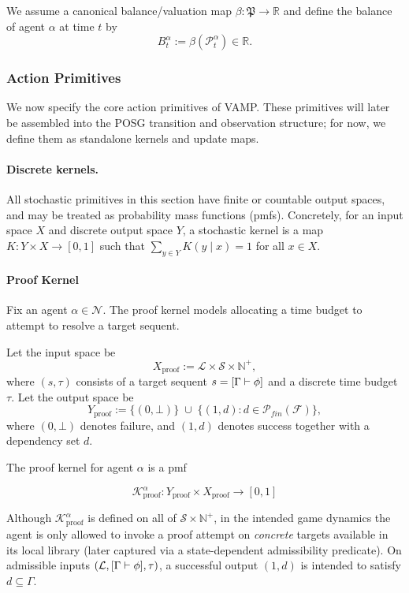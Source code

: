 We assume a canonical balance/valuation map $\beta:\mathfrak{P}\to\mathbb{R}$ and define the balance of agent $\alpha$ at time $t$ by
\[
B^\alpha_t := \beta(\mathcal{P}^\alpha_t)\in\mathbb{R}.
\]



\subsubsection{Action Primitives}

We now specify the core action primitives of VAMP. These primitives will later be assembled into the
POSG transition and observation structure; for now, we define them as standalone kernels and update maps.

\paragraph{Discrete kernels.}
All stochastic primitives in this section have finite or countable output spaces, and may be treated as
probability mass functions (pmfs). Concretely, for an input space $X$ and discrete output space $Y$,
a stochastic kernel is a map $K:Y\times X\to[0,1]$ such that $\sum_{y\in Y}K(y\mid x)=1$ for all $x\in X$.

\paragraph{Proof Kernel}

Fix an agent $\alpha\in\mathcal{N}$. The proof kernel models allocating a time budget to attempt to resolve a target sequent.

Let the input space be
\[
X_{\mathrm{proof}} := \mathscr{L}\times\mathcal{S}\times \mathbb{N}^+,
\]
where $(s,\tau)$ consists of a target sequent $s=[\Gamma\vdash\phi]$ and a discrete time budget $\tau$.
Let the output space be
\[
Y_{\mathrm{proof}} := \{(0,\bot)\}\;\cup\;\{(1,d): d\in\mathcal{P}_{fin}(\mathcal{F})\},
\]
where $(0,\bot)$ denotes failure, and $(1,d)$ denotes success together with a dependency set $d$.

The proof kernel for agent $\alpha$ is a pmf

\[\mathcal{K}^{\alpha}_{\mathrm{proof}} : Y_{\mathrm{proof}}\times X_{\mathrm{proof}} \to [0,1]\]


Although $\mathcal{K}^{\alpha}_{\mathrm{proof}}$ is defined on all of $\mathcal{S}\times\mathbb{N}^+$,
in the intended game dynamics the agent is only allowed to invoke a proof attempt on \emph{concrete} targets
available in its local library (later captured via a state-dependent admissibility predicate).
On admissible inputs $(\mathcal{L},[\Gamma\vdash\phi],\tau)$, a successful output $(1,d)$ is intended to satisfy $d\subseteq\Gamma$.

